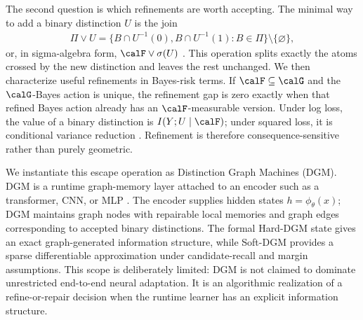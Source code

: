 The second question is which refinements are worth accepting. The minimal way to add a binary distinction $U$ is the join
\begin{align*}
\Pi\vee U
=
\{B\cap U^{-1}(0),B\cap U^{-1}(1):B\in\Pi\}\setminus\{\varnothing\},
\end{align*}
or, in sigma-algebra form, $\calF\vee\sigma(U)$ \citep{billingsley1995probability,kallenberg2002foundations}. This operation splits exactly the atoms crossed by the new distinction and leaves the rest unchanged. We then characterize useful refinements in Bayes-risk terms. If $\calF\subseteq\calG$ and the $\calG$-Bayes action is unique, the refinement gap is zero exactly when that refined Bayes action already has an $\calF$-measurable version. Under log loss, the value of a binary distinction is $I(Y;U\mid\calF)$; under squared loss, it is conditional variance reduction \citep{cover2006elements,gneiting2007strictly}. Refinement is therefore consequence-sensitive rather than purely geometric.

We instantiate this escape operation as Distinction Graph Machines (DGM). DGM is a runtime graph-memory layer attached to an encoder such as a transformer, CNN, or MLP \citep{vaswani2017attention,lecun1998gradient,rumelhart1986learning}. The encoder supplies hidden states $h=\phi_\theta(x)$; DGM maintains graph nodes with repairable local memories and graph edges corresponding to accepted binary distinctions. The formal Hard-DGM state gives an exact graph-generated information structure, while Soft-DGM provides a sparse differentiable approximation under candidate-recall and margin assumptions. This scope is deliberately limited: DGM is not claimed to dominate unrestricted end-to-end neural adaptation. It is an algorithmic realization of a refine-or-repair decision when the runtime learner has an explicit information structure.

